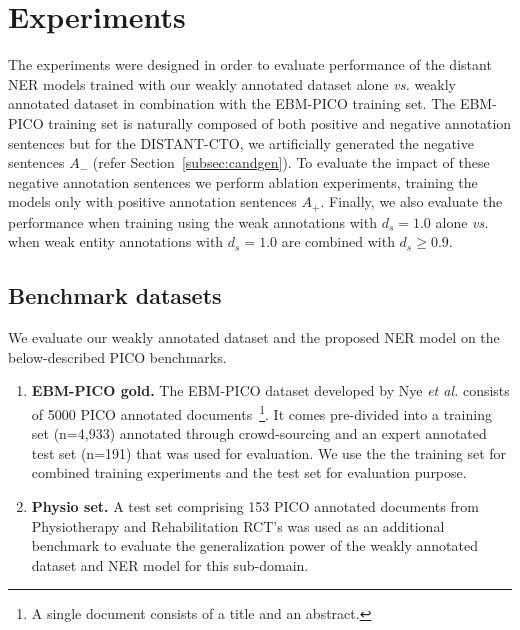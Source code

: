 \documentclass[letterpaper]{article} %
\begin{document}
\section{Experiments}
\label{sec:experiments}
%
The experiments were designed in order to evaluate performance of the distant NER models trained with our weakly annotated dataset alone \textit{vs.} weakly annotated dataset in combination with the EBM-PICO training set.
The EBM-PICO training set is naturally composed of both positive and negative annotation sentences but for the DISTANT-CTO, we artificially generated the negative sentences $A_{-}$ (refer Section~\ref{subsec:candgen}).
To evaluate the impact of these negative annotation sentences we perform ablation experiments, training the models only with positive annotation sentences $A_{+}$.
Finally, we also evaluate the performance when training using the weak annotations with $d_s = 1.0$ alone \textit{vs.} when weak entity annotations with $d_s = 1.0$ are combined with $d_s \geq 0.9$.
%
\subsection{Benchmark datasets}
\label{subsec:benchmark}
%
We evaluate our weakly annotated dataset and the proposed NER model on the below-described PICO benchmarks.
%
\begin{enumerate}[I]
    \item \textbf{EBM-PICO gold.} The EBM-PICO dataset developed by Nye \textit{et al.} consists of 5000 PICO annotated documents~\footnote{A single document consists of a title and an abstract.}. It comes pre-divided into a training set (n=4,933) annotated through crowd-sourcing and an expert annotated test set (n=191) that was used for evaluation. We use the the training set for combined training experiments and the test set for evaluation purpose.
    \item \textbf{Physio set.} A test set comprising 153 PICO annotated documents from Physiotherapy and Rehabilitation RCT's was used as an additional benchmark to evaluate the generalization power of the weakly annotated dataset and NER model for this sub-domain.
\end{enumerate}
%
\end{document}
